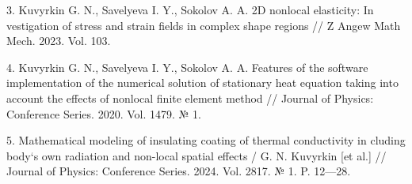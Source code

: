 3. Kuvyrkin G. N., Savelyeva I. Y., Sokolov A. A. 2D nonlocal elasticity: In vestigation of stress and strain fields in complex shape regions // Z Angew Math Mech. 2023. Vol. 103. 

4. Kuvyrkin G. N., Savelyeva I. Y., Sokolov A. A. Features of the software implementation of the numerical solution of stationary heat equation taking into account the effects of nonlocal finite element method // Journal of Physics: Conference Series. 2020. Vol. 1479. № 1.

5. Mathematical modeling of insulating coating of thermal conductivity in cluding body`s own radiation and non-local spatial effects / G. N. Kuvyrkin [et al.] // Journal of Physics: Conference Series. 2024. Vol. 2817. № 1. P. 12—28.